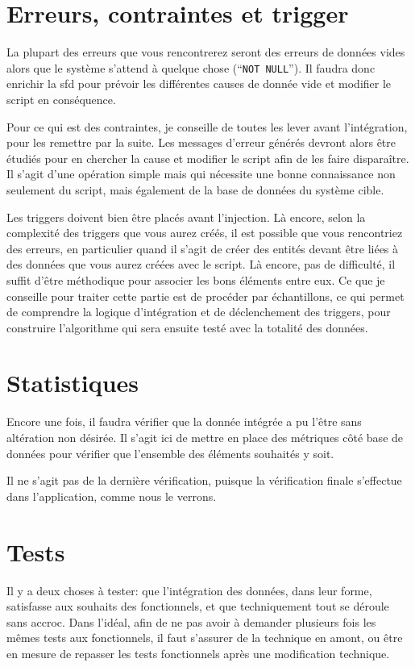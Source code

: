 \documentclass{book}
\begin{document}
\section{Erreurs, contraintes et trigger}

La plupart des erreurs que vous rencontrerez seront des erreurs de données vides alors que le système s'attend à quelque chose (``\texttt{NOT NULL}''). Il faudra donc enrichir la \gls{sfd} pour prévoir les différentes causes de donnée vide et modifier le script en conséquence.

Pour ce qui est des contraintes, je conseille de toutes les lever avant l'intégration, pour les remettre par la suite. Les messages d'erreur générés devront alors être étudiés pour en chercher la cause et modifier le script afin de les faire disparaître. Il s'agit d'une opération simple mais qui nécessite une bonne connaissance non seulement du script, mais également de la base de données du système cible.

Les triggers doivent bien être placés avant l'injection. Là encore, selon la complexité des triggers que vous aurez créés, il est possible que vous rencontriez des erreurs, en particulier quand il s'agit de créer des entités devant être liées à des données que vous aurez créées avec le script. Là encore, pas de difficulté, il suffit d'être méthodique pour associer les bons éléments entre eux. Ce que je conseille pour traiter cette partie est de procéder par échantillons, ce qui permet de comprendre la logique d'intégration et de déclenchement des triggers, pour construire l'algorithme qui sera ensuite testé avec la totalité des données.
	
\section{Statistiques}

Encore une fois, il faudra vérifier que la donnée intégrée a pu l'être sans altération non désirée. Il s'agit ici de mettre en place des métriques côté base de données pour vérifier que l'ensemble des éléments souhaités y soit.

Il ne s'agit pas de la dernière vérification, puisque la vérification finale s'effectue dans l'application, comme nous le verrons.
	
\section{Tests}

Il y a deux choses à tester: que l'intégration des données, dans leur forme, satisfasse aux souhaits des \gls{fonctionnels}, et que techniquement tout se déroule sans accroc. Dans l'idéal, afin de ne pas avoir à demander plusieurs fois les mêmes tests aux \gls{fonctionnels}, il faut s'assurer de la technique en amont, ou être en mesure de repasser les tests fonctionnels après une modification technique.
\end{document}

